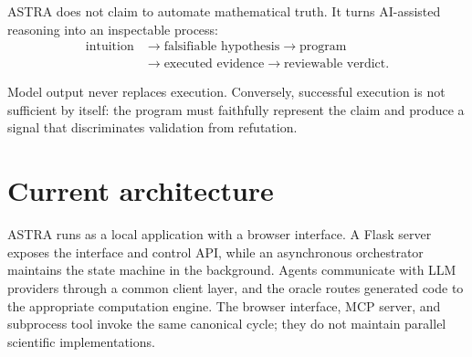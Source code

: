 \documentclass[11pt,a4paper]{article}
\begin{document}
ASTRA does not claim to automate mathematical truth. It turns AI-assisted reasoning into an inspectable process:
\[
\begin{aligned}
\text{intuition}&\longrightarrow\text{falsifiable hypothesis}
\longrightarrow\text{program}\\
&\longrightarrow\text{executed evidence}
\longrightarrow\text{reviewable verdict}.
\end{aligned}
\]

Model output never replaces execution. Conversely, successful execution is not sufficient by itself: the program must faithfully represent the claim and produce a signal that discriminates validation from refutation.

\section{Current architecture}

ASTRA runs as a local application with a browser interface. A Flask server exposes the interface and control API, while an asynchronous orchestrator maintains the state machine in the background. Agents communicate with LLM providers through a common client layer, and the oracle routes generated code to the appropriate computation engine. The browser interface, MCP server, and subprocess tool invoke the same canonical cycle; they do not maintain parallel scientific implementations.
\end{document}
